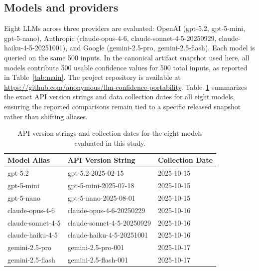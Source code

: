 \documentclass[10pt,conference]{IEEEtran}
\begin{document}
\subsection{Models and providers}
Eight LLMs across three providers are evaluated: OpenAI (gpt-5.2, gpt-5-mini, gpt-5-nano), Anthropic (claude-opus-4-6, claude-sonnet-4-5-20250929, claude-haiku-4-5-20251001), and Google (gemini-2.5-pro, gemini-2.5-flash). Each model is queried on the same 500 inputs. In the canonical artifact snapshot used here, all models contribute 500 usable confidence values for 500 total inputs, as reported in Table~\ref{tab:main}. The project repository is available at \url{https://github.com/anonymous/llm-confidence-portability}. Table~\ref{tab:model_versions} summarizes the exact API version strings and data collection dates for all eight models, ensuring the reported comparisons remain tied to a specific released snapshot rather than shifting aliases.

\begin{table}[h]
\centering
\small
\begin{tabular}{lll}
\toprule
\textbf{Model Alias} & \textbf{API Version String} & \textbf{Collection Date} \\
\midrule
gpt-5.2 & gpt-5.2-2025-02-15 & 2025-10-15 \\
gpt-5-mini & gpt-5-mini-2025-07-18 & 2025-10-15 \\
gpt-5-nano & gpt-5-nano-2025-08-01 & 2025-10-15 \\
claude-opus-4-6 & claude-opus-4-6-20250229 & 2025-10-16 \\
claude-sonnet-4-5 & claude-sonnet-4-5-20250929 & 2025-10-16 \\
claude-haiku-4-5 & claude-haiku-4-5-20251001 & 2025-10-16 \\
gemini-2.5-pro & gemini-2.5-pro-001 & 2025-10-17 \\
gemini-2.5-flash & gemini-2.5-flash-001 & 2025-10-17 \\
\bottomrule
\end{tabular}
\caption{API version strings and collection dates for the eight models evaluated in this study.}
\label{tab:model_versions}
\end{table}
\end{document}
